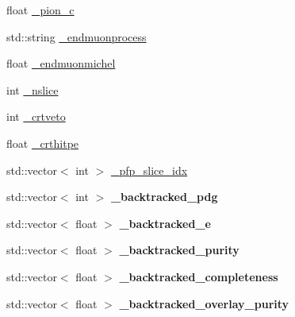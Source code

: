 \begin{DoxyCompactItemize}
\item 
float \hyperlink{classanalysis_1_1DefaultAnalysis_a9978effbcfba62536fc88a73fa985fe9}{\-\_\-pion\-\_\-c}
\item 
std\-::string \hyperlink{classanalysis_1_1DefaultAnalysis_a8cbb24a231e167258d2914f92bc4af22}{\-\_\-endmuonprocess}
\item 
float \hyperlink{classanalysis_1_1DefaultAnalysis_a3797bcb310074825add03ce03175fdc3}{\-\_\-endmuonmichel}
\item 
int \hyperlink{classanalysis_1_1DefaultAnalysis_a3eddf49910782afed7f324755fffe681}{\-\_\-nslice}
\item 
int \hyperlink{classanalysis_1_1DefaultAnalysis_a84ce9904fa527012a65c2be203a38d38}{\-\_\-crtveto}
\item 
float \hyperlink{classanalysis_1_1DefaultAnalysis_a900ec35e3ca4a00d4625a1e632bb6b40}{\-\_\-crthitpe}
\item 
std\-::vector$<$ int $>$ \hyperlink{classanalysis_1_1DefaultAnalysis_acbf0c279993cbefca72f38bc5e9f6627}{\-\_\-pfp\-\_\-slice\-\_\-idx}
\item 
\hypertarget{classanalysis_1_1DefaultAnalysis_a28bd59dce75b8fd3be70bd4996354ae9}{std\-::vector$<$ int $>$ {\bfseries \-\_\-backtracked\-\_\-pdg}}\label{classanalysis_1_1DefaultAnalysis_a28bd59dce75b8fd3be70bd4996354ae9}

\item 
\hypertarget{classanalysis_1_1DefaultAnalysis_a2c16b4988d0bccf8b7ef96a52c173b80}{std\-::vector$<$ float $>$ {\bfseries \-\_\-backtracked\-\_\-e}}\label{classanalysis_1_1DefaultAnalysis_a2c16b4988d0bccf8b7ef96a52c173b80}

\item 
\hypertarget{classanalysis_1_1DefaultAnalysis_ad08d9b30c434685e350c5f292d4df08b}{std\-::vector$<$ float $>$ {\bfseries \-\_\-backtracked\-\_\-purity}}\label{classanalysis_1_1DefaultAnalysis_ad08d9b30c434685e350c5f292d4df08b}

\item 
\hypertarget{classanalysis_1_1DefaultAnalysis_a60ef3ec6e332c118c088e0203fb858d6}{std\-::vector$<$ float $>$ {\bfseries \-\_\-backtracked\-\_\-completeness}}\label{classanalysis_1_1DefaultAnalysis_a60ef3ec6e332c118c088e0203fb858d6}

\item 
\hypertarget{classanalysis_1_1DefaultAnalysis_a29bf0fc0be5e2beffdacad2ff2e2285e}{std\-::vector$<$ float $>$ {\bfseries \-\_\-backtracked\-\_\-overlay\-\_\-purity}}\label{classanalysis_1_1DefaultAnalysis_a29bf0fc0be5e2beffdacad2ff2e2285e}


\end{DoxyCompactItemize}

